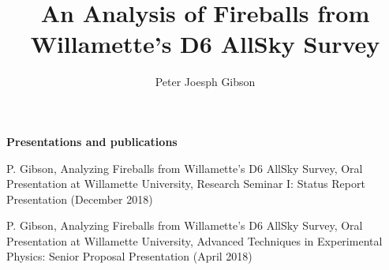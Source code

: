 \documentclass[12pt]{report}
\begin{document}
\title{An Analysis of Fireballs from Willamette's D6 AllSky Survey}
\author{Peter Joesph Gibson}

\maketitle


\newpage

\begin{center}
\textbf{Presentations and publications}

P. Gibson, Analyzing Fireballs from Willamette's D6 AllSky Survey, Oral Presentation at Willamette University, Research Seminar I: Status Report Presentation (December 2018)
\bigskip

P. Gibson, Analyzing Fireballs from Willamette's D6 AllSky Survey, Oral Presentation at Willamette University, Advanced Techniques in Experimental Physics: Senior Proposal Presentation (April 2018)

\bigskip
\end{center}



\begin{acknowledgments}

\end{acknowledgments}

\begin{abstract}

\end{abstract}

\tableofcontents
\listoffigures








%



\appendix
%
\end{document}
